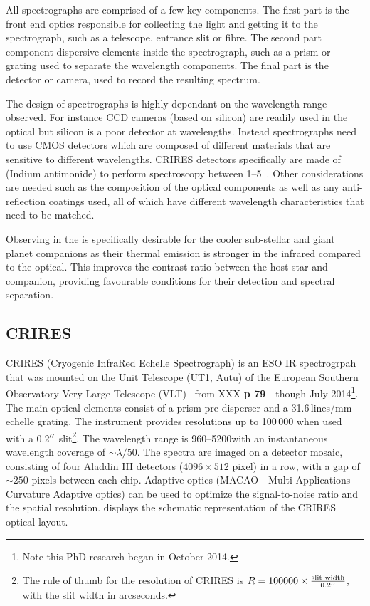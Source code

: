 All spectrographs are comprised of a few key components.
The first part is the front end optics responsible for collecting the light and getting it to the spectrograph, such as a telescope, entrance slit or fibre.
The second part component dispersive elements inside the spectrograph, such as a prism or grating used to separate the wavelength components.
The final part is the detector or camera, used to record the resulting spectrum.

The design of spectrographs is highly dependant on the wavelength range observed. For instance {CCD} cameras (based on silicon) are readily used in the optical but silicon is a poor detector at \nir{} wavelengths.
Instead \nir{} spectrographs need to use CMOS detectors which are composed of different materials that are sensitive to different wavelengths.
{CRIRES} detectors specifically are made of  (Indium antimonide) to perform spectroscopy between 1--5\um{}~\cite{dorn_crires_2004}.
Other considerations are needed such as the composition of the optical components as well as any anti-reflection coatings used, all of which have different wavelength characteristics that need to be matched.





Observing in the \nir{} is specifically desirable for the cooler sub-stellar and giant planet companions as their thermal emission is stronger in the infrared compared to the optical.
This improves the contrast ratio between the host star and companion, providing favourable conditions for their detection and spectral separation.



\subsection{CRIRES}
CRIRES (Cryogenic InfraRed Echelle Spectrograph) is an ESO IR spectrogrpah that was mounted on the Unit Telescope (UT1, Autu) of the European Southern Observatory Very Large Telescope (VLT)~\citep{kaeufl 2004 } from XXX \textbf{p 79} - though July 2014\footnote{Note this PhD research began in October 2014.}.
The main optical elements consist of a prism pre-disperser and a 31.6\,lines/mm echelle grating.
The instrument provides resolutions up to 100\,000 when used with a 0.2$^{\prime\prime}$ slit\footnote{The rule of thumb for the resolution of CRIRES is \(R = 100000 \times \frac{\textrm{slit width}}{0.2^{\prime\prime}}\), with the slit width in arcseconds.}.
The wavelength range is 960--5200\nm with an instantaneous wavelength coverage of \(\sim \lambda/50\). The spectra are imaged on a detector mosaic, consisting of four Aladdin III detectors (\(4096 \times 512\) pixel) in a row, with a gap of \(\sim 250\) pixels between each chip.
Adaptive optics (MACAO - Multi-Applications Curvature Adaptive optics) can be used to optimize the signal-to-noise ratio and the spatial resolution.
 displays the schematic representation of the CRIRES optical layout.

